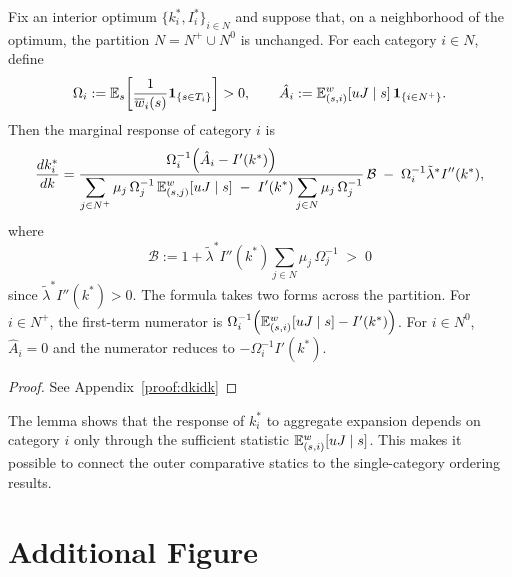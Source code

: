 \documentclass{class}
\begin{document}
\begin{lemma}\label{lem:dkidk}
Fix an interior optimum $\{k_i^\ast,I_i^\ast\}_{i\in N}$ and suppose that, on a neighborhood of the optimum, the partition $N=N^+\cup N^0$ is unchanged. For each category $i\in N$, define \[ \Omega_i := \mathbb{E}_s\!\left[\frac{1}{\overline w_i(s)}\mathbf 1_{\{s\in T_i\}}\right]>0, \qquad \hat A_i := \mathbb{E}_{(s,i)}^w[uJ\mid s]\,\mathbf 1_{\{i\in N^+\}}. \] Then the marginal response of category $i$ is \[ \frac{dk_i^\ast}{dk} = \frac{\Omega_i^{-1}\!\left(\hat A_i-I'(k^\ast)\right)}{\displaystyle\sum_{j\in N^+}\mu_j\,\Omega_j^{-1}\,\mathbb{E}_{(s,j)}^w[uJ\mid s] \;-\; I'(k^\ast)\sum_{j\in N}\mu_j\,\Omega_j^{-1}}\,\mathcal B \;-\;\Omega_i^{-1}\tilde\lambda^\ast I''(k^\ast), \] where \[ \mathcal B := 1+\tilde\lambda^\ast I''(k^\ast)\sum_{j\in N}\mu_j\,\Omega_j^{-1}\;>\;0 \] since $\tilde\lambda^\ast I''(k^\ast)>0$. The formula takes two forms across the partition. For $i\in N^+$, the first-term numerator is $\Omega_i^{-1}\!\left(\mathbb{E}_{(s,i)}^w[uJ\mid s]-I'(k^\ast)\right)$. For $i\in N^0$, $\hat A_i=0$ and the numerator reduces to $-\Omega_i^{-1}I'(k^\ast)$.
\end{lemma}
\begin{proof}
    See Appendix~\ref{proof:dkidk}
\end{proof}

The lemma shows that the response of \(k_i^\ast\) to aggregate expansion depends on category \(i\) only through the sufficient statistic \(\mathbb{E}_{(s,i)}^w[uJ\mid s]\). This makes it possible to connect the outer comparative statics to the single-category ordering results.

\newpage

\section{Additional Figure}

\end{document}
